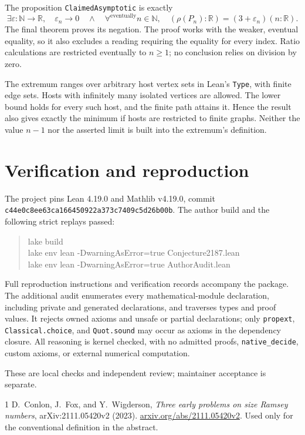 \documentclass[10pt]{article}
\newcommand{\N}{\mathbb N}
\newcommand{\R}{\mathbb R}
\newcommand{\code}[1]{\texttt{\small #1}}
\begin{document}
The proposition \code{ClaimedAsymptotic} is exactly
\[
 \exists\varepsilon:\N\to\R,\quad
 \varepsilon_n\longrightarrow0
 \quad\land\quad
 \forall^{\text{eventually}} n\in\N,\quad
 (\rho(P_n):\R)=(3+\varepsilon_n)(n:\R).
\]
The final theorem proves its negation. The proof works with the weaker,
eventual equality, so it also excludes a reading requiring the equality
for every index. Ratio calculations are restricted eventually to
$n\geq1$; no conclusion relies on division by zero.

The extremum ranges over arbitrary host vertex sets in Lean's \code{Type},
with finite edge sets. Hosts with infinitely many isolated vertices are
allowed. The lower bound holds for every such host, and the finite path
attains it. Hence the result also gives exactly the minimum if hosts are
restricted to finite graphs. Neither the value $n-1$ nor the asserted
limit is built into the extremum's definition.

\section{Verification and reproduction}
The project pins Lean 4.19.0 and Mathlib v4.19.0, commit
\code{c44e0c8ee63ca166450922a373c7409c5d26b00b}.
The author build and the following strict replays passed:
\begin{quote}\ttfamily\small
lake build\\
lake env lean -DwarningAsError=true Conjecture2187.lean\\
lake env lean -DwarningAsError=true AuthorAudit.lean
\end{quote}
Full reproduction instructions and verification records accompany the package.
The additional audit enumerates every mathematical-module declaration,
including private and generated declarations, and traverses types and
proof values. It rejects owned axioms and unsafe or partial declarations;
only \code{propext}, \code{Classical.choice}, and \code{Quot.sound} may
occur as axioms in the dependency closure. All reasoning is kernel checked,
with no admitted proofs, \code{native\_decide}, custom axioms, or external
numerical computation.

These are local checks and independent review; maintainer acceptance is separate.

\begin{thebibliography}{1}
\small
{}
D.~Conlon, J.~Fox, and Y.~Wigderson,
\emph{Three early problems on size Ramsey numbers},
arXiv:2111.05420v2 (2023).
\href{https://arxiv.org/abs/2111.05420v2}{arxiv.org/abs/2111.05420v2}.
Used only for the conventional definition in the abstract.
\end{thebibliography}
\end{document}
